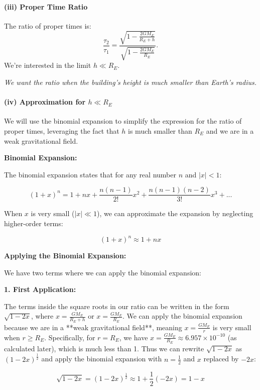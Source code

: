     \paragraph{(iii) Proper Time Ratio}

    The ratio of proper times is:
    \[
        \frac{\tau_2}{\tau_1} = \frac{\sqrt{1 - \frac{2GM_E}{R_E + h}}}{\sqrt{1 - \frac{2GM_E}{R_E}}}.
    \]
    We're interested in the limit $h \ll R_E$.

    \textit{We want the ratio when the building's height is much smaller than Earth's radius.}

    \paragraph{(iv) Approximation for \(h \ll R_E\)}

    We will use the binomial expansion to simplify the expression for the ratio of proper times, leveraging the fact that \(h\) is much smaller than \(R_E\) and we are in a weak gravitational field.

    \textbf{Binomial Expansion:}

    The binomial expansion states that for any real number \(n\) and \(|x| < 1\):

    \[ (1+x)^n = 1 + nx + \frac{n(n-1)}{2!}x^2 + \frac{n(n-1)(n-2)}{3!}x^3 + ... \]

    When \(x\) is very small (\(|x| \ll 1\)), we can approximate the expansion by neglecting higher-order terms:

    \[ (1+x)^n \approx 1 + nx \]

    \textbf{Applying the Binomial Expansion:}

    We have two terms where we can apply the binomial expansion:

    \textbf{1. First Application:}

    The terms inside the square roots in our ratio can be written in the form \(\sqrt{1 - 2x}\), where \(x = \frac{GM_E}{R_E + h}\) or \(x = \frac{GM_E}{R_E}\). We can apply the binomial expansion because we are in a **weak gravitational field**, meaning \(x = \frac{GM_E}{r}\) is very small when \(r \geq R_E\). Specifically, for \(r = R_E\), we have \(x = \frac{GM_E}{R_E} \approx 6.957 \times 10^{-10}\) (as calculated later), which is much less than 1. Thus we can rewrite \(\sqrt{1 - 2x}\) as \((1 - 2x)^{\frac{1}{2}}\) and apply the binomial expansion with \(n = \frac{1}{2}\) and \(x\) replaced by \(-2x\):

    \[
        \sqrt{1 - 2x} = (1 - 2x)^{\frac{1}{2}} \approx 1 + \frac{1}{2}(-2x) = 1 - x
    \]

